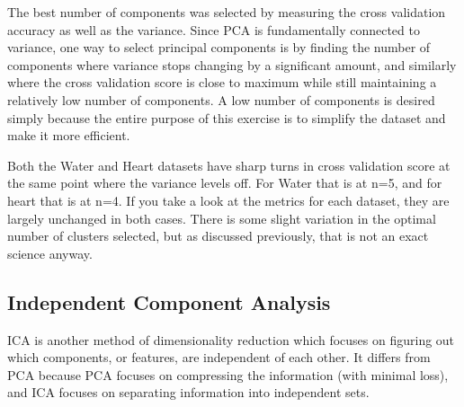 \documentclass[
	letterpaper, %
]{mlreport}
\begin{document}
The best number of components was selected by measuring the cross validation accuracy as well as the variance. Since PCA is fundamentally connected to variance, one way to select principal components is by finding the number of components where variance stops changing by a significant amount, and similarly where the cross validation score is close to maximum while still maintaining a relatively low number of components. A low number of components is desired simply because the entire purpose of this exercise is to simplify the dataset and make it more efficient.

Both the Water and Heart datasets have sharp turns in cross validation score at the same point where the variance levels off. For Water that is at n=5, and for heart that is at n=4. If you take a look at the metrics for each dataset, they are largely unchanged in both cases. There is some slight variation in the optimal number of clusters selected, but as discussed previously, that is not an exact science anyway.

\subsection{Independent Component Analysis}
ICA is another method of dimensionality reduction which focuses on figuring out which components, or features, are independent of each other. It differs from PCA because PCA focuses on compressing the information (with minimal loss), and ICA focuses on separating information into independent sets.
\end{document}
